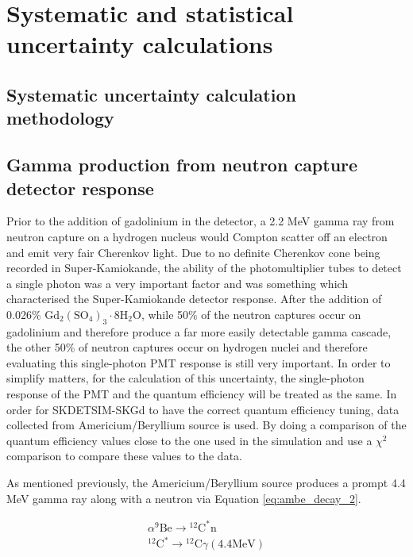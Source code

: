 \chapter{Systematic and statistical uncertainty calculations}
\label{chp:syst}



\section{Systematic uncertainty calculation methodology}



\section{Gamma production from neutron capture detector response}

Prior to the addition of gadolinium in the detector, a 2.2 MeV gamma ray from neutron capture on a hydrogen nucleus would Compton scatter off an electron and emit very fair Cherenkov light. Due to no definite Cherenkov cone being recorded in Super-Kamiokande, the ability of the photomultiplier tubes to detect a single photon was a very important factor and was something which characterised the Super-Kamiokande detector response. After the addition of 0.026\% $\mathrm{Gd}_{2}\left(\mathrm{SO}_{4}\right)_{3} \cdot 8 \mathrm{H}_{2} \mathrm{O}$, while 50\% of the neutron captures occur on gadolinium and therefore produce a far more easily detectable gamma cascade, the other 50\% of neutron captures occur on hydrogen nuclei and therefore evaluating this single-photon PMT response is still very important. In order to simplify matters, for the calculation of this uncertainty, the single-photon response of the PMT and the quantum efficiency will be treated as the same. In order for SKDETSIM-SKGd to have the correct quantum efficiency tuning, data collected from Americium/Beryllium source is used. By doing a comparison of the quantum efficiency values close to the one used in the simulation and use a $\chi^{2}$ comparison to compare these values to the data. 

As mentioned previously, the Americium/Beryllium source produces a prompt 4.4 MeV gamma ray along with a neutron via Equation \ref{eq:ambe_decay_2}. 




\begin{equation}
\begin{aligned}
\alpha{ }^9 \mathrm{Be} \longrightarrow{ }^{12} \mathrm{C}^* \mathrm{n} \\
{ }^{12} \mathrm{C}^* \longrightarrow{ }^{12} \mathrm{C} \gamma(4.4 \mathrm{MeV})
\end{aligned}
\label{eq:ambe_decay_2}
\end{equation}

